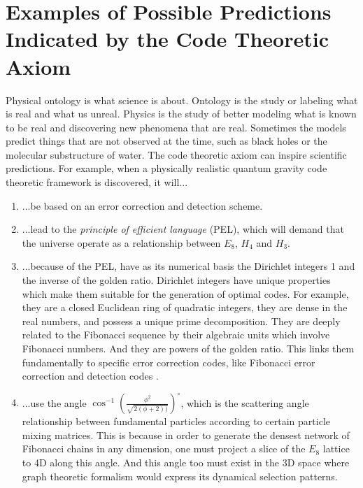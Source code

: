 \documentclass[submission,copyright,creativecommons]{eptcs}
\begin{document}
\section{Examples of Possible Predictions Indicated by the Code Theoretic Axiom}
\label{sec:11}

Physical ontology is what science is about. Ontology is the study or labeling what is real and what us unreal. Physics is the study of better modeling what is known to be real and discovering new phenomena that are real. Sometimes the models predict things that are not observed at the time, such as black holes or the molecular substructure of water. The code theoretic axiom can inspire scientific predictions. For example, when a physically realistic quantum gravity code theoretic framework is discovered, it will...

\begin{enumerate}
  \item ...be based on an error correction and detection scheme.\\
  \item ...lead to the \textit{principle of efficient language} (PEL), which will demand that the universe operate as a relationship between $E_{8}$, $H_{4}$ and $H_{3}$.\\
  \item ...because of the PEL, have as its numerical basis the Dirichlet integers 1 and the inverse of the golden ratio. Dirichlet integers have unique properties which make them suitable for the generation of optimal codes. For example, they are a closed Euclidean ring of quadratic integers, they are dense in the real numbers, and possess a unique prime decomposition. They are deeply related to the Fibonacci sequence by their algebraic units which involve Fibonacci numbers. And they are powers of the golden ratio. This links them fundamentally to specific error correction codes, like Fibonacci error correction and detection codes \cite{fraenkel1996robust}.\\
  \item ...use the angle $\cos^{-1} \left (\frac{\phi^2}{\sqrt{2(\phi +2))}}  \right )^{\circ} $, which is the scattering angle relationship between fundamental particles according to certain particle mixing matrices\cite{kim2011quark}. This is because in order to generate the densest network of Fibonacci chains in any dimension, one must project a slice of the $E_{8}$ lattice to 4D along this angle. And this angle too must exist in the 3D space where graph theoretic formalism would express its dynamical selection patterns.\\

\end{enumerate}
\end{document}
